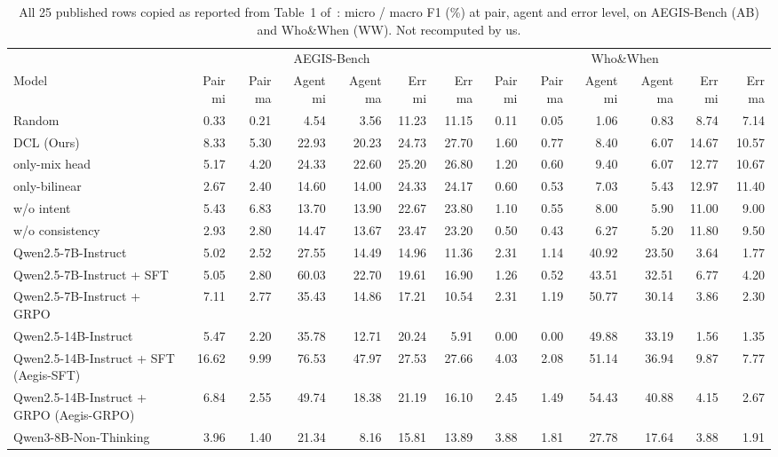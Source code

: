 \begin{table}[t]
\caption{All 25 published rows copied as reported from Table~1 of~\cite{aegis}: micro / macro F1 (\%) at pair, agent and error level, on AEGIS-Bench (AB) and Who\&When (WW). Not recomputed by us.}
\label{tab:pubfull}
\centering\tiny\setlength{\tabcolsep}{2.5pt}
\begin{tabular}{@{}lrrrrrrrrrrrr@{}}
\toprule
 & \multicolumn{6}{c}{AEGIS-Bench} & \multicolumn{6}{c}{Who\&When} \\
\cmidrule(lr){2-7}\cmidrule(lr){8-13}
Model & Pair mi & Pair ma & Agent mi & Agent ma & Err mi & Err ma & Pair mi & Pair ma & Agent mi & Agent ma & Err mi & Err ma \\
\midrule
Random & 0.33 & 0.21 & 4.54 & 3.56 & 11.23 & 11.15 & 0.11 & 0.05 & 1.06 & 0.83 & 8.74 & 7.14 \\
DCL (Ours) & 8.33 & 5.30 & 22.93 & 20.23 & 24.73 & 27.70 & 1.60 & 0.77 & 8.40 & 6.07 & 14.67 & 10.57 \\
only-mix head & 5.17 & 4.20 & 24.33 & 22.60 & 25.20 & 26.80 & 1.20 & 0.60 & 9.40 & 6.07 & 12.77 & 10.67 \\
only-bilinear & 2.67 & 2.40 & 14.60 & 14.00 & 24.33 & 24.17 & 0.60 & 0.53 & 7.03 & 5.43 & 12.97 & 11.40 \\
w/o intent & 5.43 & 6.83 & 13.70 & 13.90 & 22.67 & 23.80 & 1.10 & 0.55 & 8.00 & 5.90 & 11.00 & 9.00 \\
w/o consistency & 2.93 & 2.80 & 14.47 & 13.67 & 23.47 & 23.20 & 0.50 & 0.43 & 6.27 & 5.20 & 11.80 & 9.50 \\
Qwen2.5-7B-Instruct & 5.02 & 2.52 & 27.55 & 14.49 & 14.96 & 11.36 & 2.31 & 1.14 & 40.92 & 23.50 & 3.64 & 1.77 \\
Qwen2.5-7B-Instruct {+} SFT & 5.05 & 2.80 & 60.03 & 22.70 & 19.61 & 16.90 & 1.26 & 0.52 & 43.51 & 32.51 & 6.77 & 4.20 \\
Qwen2.5-7B-Instruct {+} GRPO & 7.11 & 2.77 & 35.43 & 14.86 & 17.21 & 10.54 & 2.31 & 1.19 & 50.77 & 30.14 & 3.86 & 2.30 \\
Qwen2.5-14B-Instruct & 5.47 & 2.20 & 35.78 & 12.71 & 20.24 & 5.91 & 0.00 & 0.00 & 49.88 & 33.19 & 1.56 & 1.35 \\
Qwen2.5-14B-Instruct {+} SFT (Aegis-SFT) & 16.62 & 9.99 & 76.53 & 47.97 & 27.53 & 27.66 & 4.03 & 2.08 & 51.14 & 36.94 & 9.87 & 7.77 \\
Qwen2.5-14B-Instruct {+} GRPO (Aegis-GRPO) & 6.84 & 2.55 & 49.74 & 18.38 & 21.19 & 16.10 & 2.45 & 1.49 & 54.43 & 40.88 & 4.15 & 2.67 \\
Qwen3-8B-Non-Thinking & 3.96 & 1.40 & 21.34 & 8.16 & 15.81 & 13.89 & 3.88 & 1.81 & 27.78 & 17.64 & 3.88 & 1.91 \\

\end{tabular}
\end{table}
